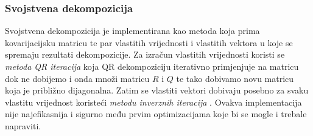 \documentclass[zavrsnirad, upload]{fer}
\begin{document}
\subsubsection{Svojstvena dekompozicija}
\label{sek:svojstvena_dekompozicija}
Svojstvena dekompozicija je implementirana kao metoda koja prima
kovarijacijsku matricu te par vlastitih vrijednosti i vlastitih vektora u koje
se spremaju rezultati dekompozicije.
Za izračun vlastitih vrijednosti koristi se \emph{metoda QR iteracija}
\cite{NLA} koja QR dekompoziciju
iterativno primjenjuje na matricu dok ne dobijemo i onda množi
matricu $R$ i $Q$ te tako dobivamo novu matricu koja je
približno dijagonalna. Zatim se vlastiti vektori dobivaju
posebno za svaku vlastitu vrijednost koristeći \emph{metodu
inverznih iteracija} \cite{NLA}. Ovakva implementacija nije
najefikasnija i sigurno među prvim optimizacijama koje bi se mogle
i trebale napraviti.
\end{document}
